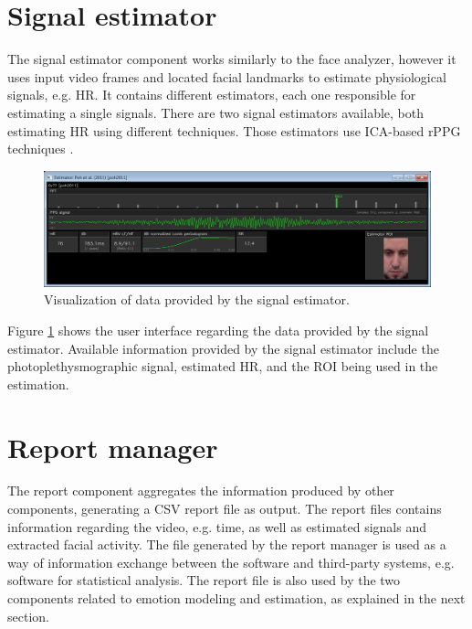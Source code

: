 \section{Signal estimator}

The signal estimator component works similarly to the face analyzer, however it uses input video frames and located facial landmarks to estimate physiological signals, e.g. HR. It contains different estimators, each one responsible for estimating a single signals. There are two signal estimators available, both estimating HR using different techniques. Those estimators use ICA-based rPPG techniques \parencite{poh2010non,poh2011advancements}.

\begin{figure}
    \centering
    \includegraphics[width=\textwidth]{figures/tool-ui-signal-estimator.png}
    \caption{Visualization of data provided by the signal estimator.}
    \label{fig:tool-ui-signal-estimator}
\end{figure}

Figure \ref{fig:tool-ui-signal-estimator} shows the user interface regarding the data provided by the signal estimator. Available information provided by the signal estimator include the photoplethysmographic signal, estimated HR, and the ROI being used in the estimation.

\section{Report manager}

The report component aggregates the information produced by other components, generating a CSV report file as output. The report files contains information regarding the video, e.g. time, as well as estimated signals and extracted facial activity. The file generated by the report manager is used as a way of information exchange between the software and third-party systems, e.g. software for statistical analysis. The report file is also used by the two components related to emotion modeling and estimation, as explained in the next section.

